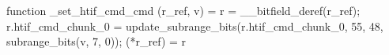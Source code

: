 function _set_htif_cmd_cmd (r_ref, v) = {
    r = __bitfield_deref(r_ref);
    r.htif_cmd_chunk_0 = update_subrange_bits(r.htif_cmd_chunk_0, 55, 48, subrange_bits(v, 7, 0));
    (*r_ref) = r
}
